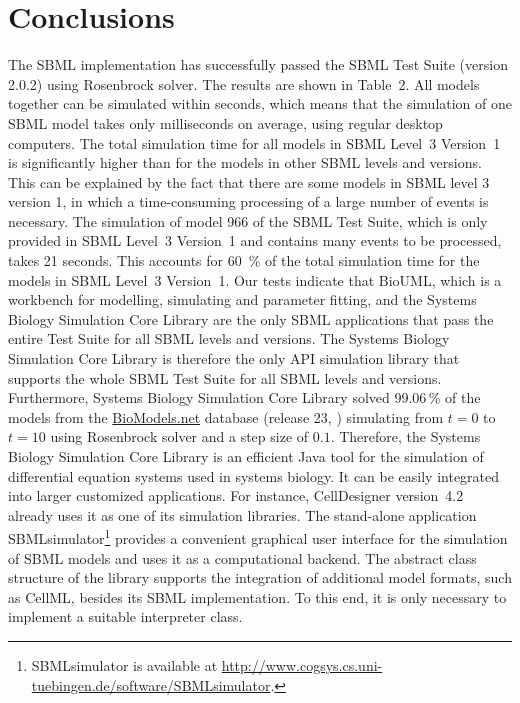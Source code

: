 \documentclass[10pt]{bmc_article}
\newenvironment{bmcformat}{\baselineskip20pt\sloppy\setboolean{publ}{false}}{\baselineskip20pt\sloppy}
\begin{document}
\begin{bmcformat}
\section*{Conclusions}
The SBML implementation has successfully passed the
SBML Test Suite (version 2.0.2) using Rosenbrock solver.
The results are shown in Table~2.
All models together can be simulated within seconds, which means that the simulation of one SBML model takes only milliseconds on average, using regular desktop computers.
The total simulation time for all models in SBML Level~3 Version~1 is significantly higher than for the models in other SBML levels and versions.
This can be explained by the fact that there are some models in SBML level 3 version 1, in which a time-consuming processing of a large number of events is necessary.
The simulation of model 966 of the SBML Test Suite, which is only provided in SBML Level~3 Version~1 and contains many events to be processed, takes 21 seconds.
This accounts for 60~\% of the total simulation time for the models in SBML Level~3 Version~1. 
Our tests indicate that BioUML, which is a workbench for modelling, simulating and parameter fitting, and the Systems Biology Simulation Core Library are the only SBML applications that pass the entire Test Suite for all SBML levels and versions.
The Systems Biology Simulation Core Library is therefore the only API simulation library that supports the whole SBML Test Suite for all SBML levels and versions.
Furthermore, Systems Biology Simulation Core Library solved 99.06\,\% of the models from the
\href{http://biomodels.net}{BioModels.net} database (release 23,
\cite{Novere2006a}) simulating from $t = 0$ to $t = 10$ using Rosenbrock solver and a step size of $0.1$.
Therefore, the Systems Biology Simulation Core Library is an efficient Java tool for the
simulation of differential equation systems used in systems biology. It can be
easily integrated into larger customized applications.
For instance, CellDesigner version~4.2 \cite{Funahashi2003} already uses it as one of its simulation libraries.
The stand-alone application SBMLsimulator\footnote{SBMLsimulator is available at
\url{http://www.cogsys.cs.uni-tuebingen.de/software/SBMLsimulator}.}
provides a convenient graphical user interface for the simulation of SBML
models and uses it as a computational backend.
The abstract class structure of the library supports the integration of
additional model formats, such as CellML, besides its SBML implementation. To
this end, it is only necessary to implement a suitable interpreter class.


\end{bmcformat}
\end{document}
